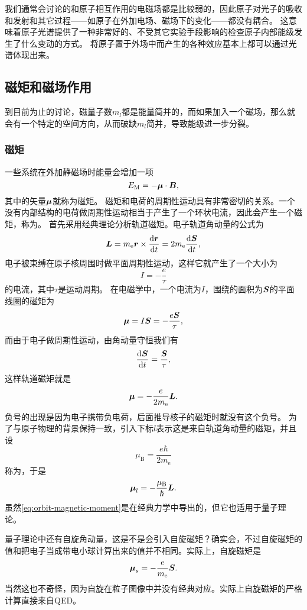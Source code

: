 我们通常会讨论的和原子相互作用的电磁场都是比较弱的，因此原子对光子的吸收和发射和其它过程——如原子在外加电场、磁场下的变化——都没有耦合。
这意味着原子光谱提供了一种非常好的、不受其它实验手段影响的检查原子内部能级发生了什么变动的方式。
将原子置于外场中而产生的各种效应基本上都可以通过光谱体现出来。

\subsection{磁矩和磁场作用}

到目前为止的讨论，磁量子数$m_l$都是能量简并的，而如果加入一个磁场，那么就会有一个特定的空间方向，从而破缺$m_l$简并，导致能级进一步分裂。

\subsubsection{磁矩}

一些系统在外加静磁场时能量会增加一项
\[
    E_\text{M} = - \vb*{\mu} \cdot \vb*{B},
\]
其中的矢量$\vb*{\mu}$就称为磁矩。
磁矩和电荷的周期性运动具有非常密切的关系。一个没有内部结构的电荷做周期性运动相当于产生了一个环状电流，因此会产生一个磁矩，称为。
首先采用经典理论分析轨道磁矩。电子轨道角动量的公式为
\[
    \vb*{L} = m_\text{e} \vb*{r} \times \dv{\vb*{r}}{t} = 2 m_\text{e} \dv{\vb*{S}}{t},
\]
电子被束缚在原子核周围时做平面周期性运动，这样它就产生了一个大小为
\[
    I = - \frac{e}{\tau}
\]
的电流，其中$\tau$是运动周期。
在电磁学中，一个电流为$I$，围绕的面积为$\vb*{S}$的平面线圈的磁矩为
\[
    \vb*{\mu} = I \vb*{S} = - \frac{e \vb*{S}}{\tau},
\]
而由于电子做周期性运动，由角动量守恒我们有
\[
    \dv{\vb*{S}}{t} = \frac{\vb*{S}}{\tau},
\]
这样轨道磁矩就是
\[
    \vb*{\mu} = - \frac{e}{2m_\text{e}} \vb*{L}.
\]
负号的出现是因为电子携带负电荷，后面推导核子的磁矩时就没有这个负号。
为了与原子物理的背景保持一致，引入下标$l$表示这是来自轨道角动量的磁矩，并且设
\begin{equation}
    \mu_\text{B} = \frac{e\hbar}{2m_\text{e}}
\end{equation}
称为，于是
\begin{equation}
    \vb*{\mu}_l = - \frac{\mu_\text{B}}{\hbar} \vb*{L}.
    \label{eq:orbit-magnetic-moment}
\end{equation}
虽然\eqref{eq:orbit-magnetic-moment}是在经典力学中导出的，但它也适用于量子理论。

量子理论中还有自旋角动量，这是不是会引入自旋磁矩？确实会，不过自旋磁矩的值和把电子当成带电小球计算出来的值并不相同。实际上，自旋磁矩是
\begin{equation}
    \vb*{\mu}_s = - \frac{e}{m_\text{e}} \vb*{S}.
\end{equation}
当然这也不奇怪，因为自旋在粒子图像中并没有经典对应。实际上自旋磁矩的严格计算直接来自QED。

